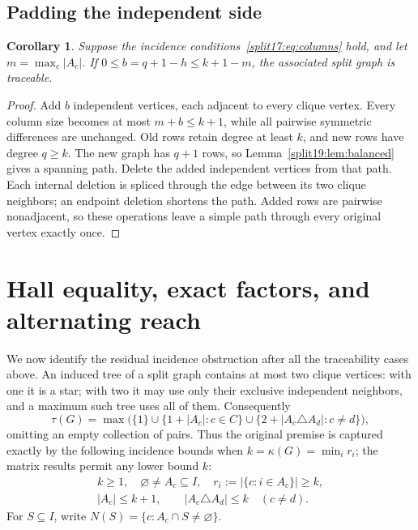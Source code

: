 \documentclass[11pt,a4paper]{article}
\newtheorem{corollary}[theorem]{Corollary}
\theoremstyle{definition}\newtheorem{definition}[theorem]{Definition}
\theoremstyle{remark}\newtheorem{remark}[theorem]{Remark}
\begin{document}
\subsection{Padding the independent side}
\begin{corollary}\label{split:padding}
Suppose the incidence conditions~\eqref{split17:eq:columns} hold, and let
$m=\max_c|A_c|$. If $0\le b=q+1-h\le k+1-m$, the associated split graph
is traceable.
\end{corollary}
\begin{proof}
Add $b$ independent vertices, each adjacent to every clique vertex.
Every column size becomes at most $m+b\le k+1$, while all pairwise
symmetric differences are unchanged. Old rows retain degree at least
$k$, and new rows have degree $q\ge k$. The new graph has $q+1$ rows,
so Lemma~\ref{split19:lem:balanced} gives a spanning path.
Delete the added independent vertices from that path. Each internal
deletion is spliced through the edge between its two clique neighbors;
an endpoint deletion shortens the path. Added rows are pairwise
nonadjacent, so these operations leave a simple path through every
original vertex exactly once.
\end{proof}


\section{Hall equality, exact factors, and alternating reach}
\label{sec:split-capacity}
We now identify the residual incidence obstruction after all the
traceability cases above. An induced tree of a split graph contains
at most two clique vertices: with one it is a star; with two it may
use only their exclusive independent neighbors, and a maximum such
tree uses all of them.
Consequently
\[
 \tau(G)=\max\bigl(\{1\}\cup\{1+|A_c|:c\in C\}
 \cup\{2+|A_c\triangle A_d|:c\ne d\}\bigr),
\]
omitting an empty collection of pairs. Thus the original premise is
captured exactly by the following incidence bounds when
$k=\kappa(G)=\min_i r_i$; the matrix results permit any lower bound $k$:
\begin{equation}\label{split21:H}
\begin{gathered}
 k\ge1,\quad \varnothing\ne A_c\subseteq I,\quad
 r_i:=|\{c:i\in A_c\}|\ge k,\\
 |A_c|\le k+1,\qquad |A_c\triangle A_d|\le k\quad(c\ne d).
\end{gathered}
\end{equation}
For $S\subseteq I$, write $N(S)=\{c:A_c\cap S\ne\varnothing\}$.
\end{document}
